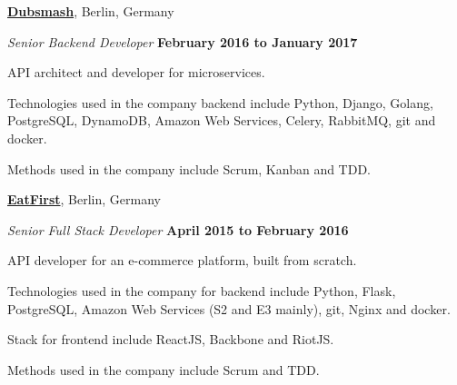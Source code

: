 \documentclass[10pt]{article}
\newenvironment{outerlist}[1][\enskip\textbullet]%
        {\begin{itemize}[#1]}{\end{itemize}%
         \vspace{-.6\baselineskip}}
\newenvironment{innerlist}[1][\enskip\textbullet]%
        {\begin{compactitem}[#1]}{\end{compactitem}}
\newcommand{\blankline}{\quad\pagebreak[2]}
\begin{document}
\blankline

\href{http://dubsmash.com/}{\textbf{Dubsmash}},
Berlin, Germany
\begin{outerlist}

\item[] \textit{Senior Backend Developer}%
        \hfill \textbf{February 2016 to January 2017}
\begin{innerlist}
    \item API architect and developer for microservices.
    \item Technologies used in the company backend include Python, Django, Golang, PostgreSQL, DynamoDB,
     Amazon Web Services, Celery, RabbitMQ, git and docker.
    \item Methods used in the company include Scrum, Kanban and TDD.
\end{innerlist}

\end{outerlist}

\blankline

\href{http://eatfirst.com/}{\textbf{EatFirst}},
Berlin, Germany
\begin{outerlist}

\item[] \textit{Senior Full Stack Developer}%
        \hfill \textbf{April 2015 to February 2016}
\begin{innerlist}
    \item API developer for an e-commerce platform, built from scratch.
    \item Technologies used in the company for backend include Python, Flask, PostgreSQL, Amazon Web Services
    (S2 and E3 mainly), git, Nginx and docker.
    \item Stack for frontend include ReactJS, Backbone and RiotJS.
    \item Methods used in the company include Scrum and TDD.
\end{innerlist}

\end{outerlist}

\blankline
\end{document}
